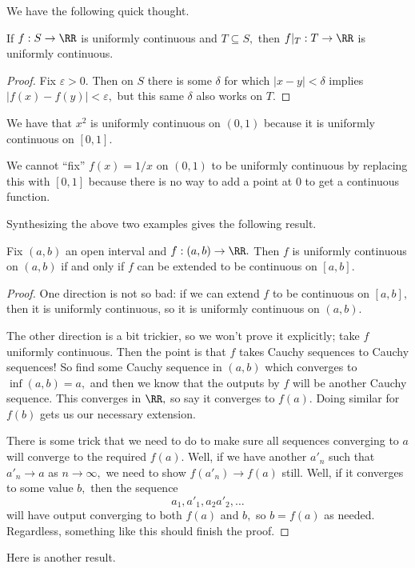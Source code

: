 \documentclass[../notes.tex]{subfiles}
\begin{document}
We have the following quick thought.
\begin{proposition}
	If $f:S\to\RR$ is uniformly continuous and $T\subseteq S,$ then $f|_T:T\to\RR$ is uniformly continuous. 
\end{proposition}
\begin{proof}
	Fix $\varepsilon>0.$ Then on $S$ there is some $\delta$ for which $|x-y|<\delta$ implies $|f(x)-f(y)|<\varepsilon,$ but this same $\delta$ also works on $T.$
\end{proof}
\begin{example}
	We have that $x^2$ is uniformly continuous on $(0,1)$ because it is uniformly continuous on $[0,1].$
\end{example}
\begin{nex}
	We cannot ``fix'' $f(x)=1/x$ on $(0,1)$ to be uniformly continuous by replacing this with $[0,1]$ because there is no way to add a point at $0$ to get a continuous function.
\end{nex}
Synthesizing the above two examples gives the following result.
\begin{theorem}
	Fix $(a,b)$ an open interval and $f:(a,b)\to\RR.$ Then $f$ is uniformly continuous on $(a,b)$ if and only if $f$ can be extended to be continuous on $[a,b].$
\end{theorem}
\begin{proof}
	One direction is not so bad: if we can extend $f$ to be continuous on $[a,b],$ then it is uniformly continuous, so it is uniformly continuous on $(a,b).$

	The other direction is a bit trickier, so we won't prove it explicitly; take $f$ uniformly continuous. Then the point is that $f$ takes Cauchy sequences to Cauchy sequences! So find some Cauchy sequence in $(a,b)$ which converges to $\inf(a,b)=a,$ and then we know that the outputs by $f$ will be another Cauchy sequence. This converges in $\RR,$ so say it converges to $f(a).$ Doing similar for $f(b)$ gets us our necessary extension.

	There is some trick that we need to do to make sure all sequences converging to $a$ will converge to the required $f(a).$ Well, if we have another $a'_n$ such that $a'_n\to a$ as $n\to\infty,$ we need to show $f(a'_n)\to f(a)$ still. Well, if it converges to some value $b,$ then the sequence
	\[a_1,a'_1,a_2 a'_2,\ldots\]
	will have output converging to both $f(a)$ and $b,$ so $b=f(a)$ as needed. Regardless, something like this should finish the proof.
\end{proof}
Here is another result.
\end{document}

